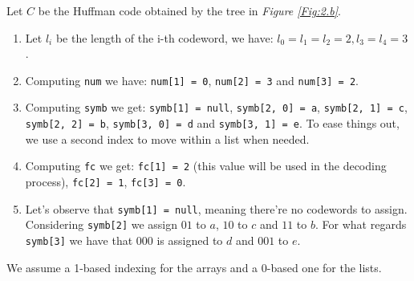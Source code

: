 \documentclass{subfiles}
\begin{document}
    \begin{example*}
        Let \(C\) be the Huffman code obtained by the tree in \emph{Figure \ref{Fig:2.b}}.
        \begin{enumerate}
            \item Let \(l_{i}\) be the length of the i-th codeword,
                we have: \(l_{0} = l_{1} = l_{2} = 2, l_{3} = l_{4} = 3\).

            \item Computing \lstinline{num} we have:
                \lstinline{num[1] = 0}, 
                \lstinline{num[2] = 3} and \lstinline{num[3] = 2}.

            \item Computing \lstinline{symb} we get:
                \lstinline{symb[1] = null}, 
                \lstinline{symb[2, 0] = a},
                \lstinline{symb[2, 1] = c},
                \lstinline{symb[2, 2] = b},
                \lstinline{symb[3, 0] = d} and 
                \lstinline{symb[3, 1] = e}.
                To ease things out, 
                    we use a second index to move within a list when needed.

            \item Computing \lstinline{fc} we get:
                \lstinline{fc[1] = 2} 
                (this value will be used in the decoding process),
                \lstinline{fc[2] = 1},
                \lstinline{fc[3] = 0}.

            \item Let's observe that \lstinline{symb[1] = null}, 
                    meaning there're no codewords to assign.
                    Considering \lstinline{symb[2]} we assign \(01\) to \(a\),
                    \(10\) to \(c\) and \(11\) to \(b\). 
                    For what regards \lstinline{symb[3]} we have that \(000\) is 
                    assigned to \(d\) and \(001\) to \(e\).
        \end{enumerate}
    \end{example*}
    We assume a 1-based indexing for the arrays and a 0-based one for the lists.
\end{document}
